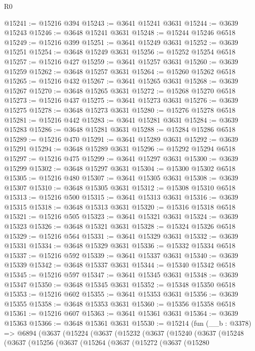 \begin{lexlean}{R0}
\begin{coremodule}
@15241 := @15216 @394
@15243 := @3641 @15241 @3631
@15244 := @3639 @15243
@15246 := @3648 @15241 @3631
@15248 := @15244 @15246 @6518
@15249 := @15216 @399
@15251 := @3641 @15249 @3631
@15252 := @3639 @15251
@15254 := @3648 @15249 @3631
@15256 := @15252 @15254 @6518
@15257 := @15216 @427
@15259 := @3641 @15257 @3631
@15260 := @3639 @15259
@15262 := @3648 @15257 @3631
@15264 := @15260 @15262 @6518
@15265 := @15216 @432
@15267 := @3641 @15265 @3631
@15268 := @3639 @15267
@15270 := @3648 @15265 @3631
@15272 := @15268 @15270 @6518
@15273 := @15216 @437
@15275 := @3641 @15273 @3631
@15276 := @3639 @15275
@15278 := @3648 @15273 @3631
@15280 := @15276 @15278 @6518
@15281 := @15216 @442
@15283 := @3641 @15281 @3631
@15284 := @3639 @15283
@15286 := @3648 @15281 @3631
@15288 := @15284 @15286 @6518
@15289 := @15216 @470
@15291 := @3641 @15289 @3631
@15292 := @3639 @15291
@15294 := @3648 @15289 @3631
@15296 := @15292 @15294 @6518
@15297 := @15216 @475
@15299 := @3641 @15297 @3631
@15300 := @3639 @15299
@15302 := @3648 @15297 @3631
@15304 := @15300 @15302 @6518
@15305 := @15216 @480
@15307 := @3641 @15305 @3631
@15308 := @3639 @15307
@15310 := @3648 @15305 @3631
@15312 := @15308 @15310 @6518
@15313 := @15216 @500
@15315 := @3641 @15313 @3631
@15316 := @3639 @15315
@15318 := @3648 @15313 @3631
@15320 := @15316 @15318 @6518
@15321 := @15216 @505
@15323 := @3641 @15321 @3631
@15324 := @3639 @15323
@15326 := @3648 @15321 @3631
@15328 := @15324 @15326 @6518
@15329 := @15216 @564
@15331 := @3641 @15329 @3631
@15332 := @3639 @15331
@15334 := @3648 @15329 @3631
@15336 := @15332 @15334 @6518
@15337 := @15216 @592
@15339 := @3641 @15337 @3631
@15340 := @3639 @15339
@15342 := @3648 @15337 @3631
@15344 := @15340 @15342 @6518
@15345 := @15216 @597
@15347 := @3641 @15345 @3631
@15348 := @3639 @15347
@15350 := @3648 @15345 @3631
@15352 := @15348 @15350 @6518
@15353 := @15216 @602
@15355 := @3641 @15353 @3631
@15356 := @3639 @15355
@15358 := @3648 @15353 @3631
@15360 := @15356 @15358 @6518
@15361 := @15216 @607
@15363 := @3641 @15361 @3631
@15364 := @3639 @15363
@15366 := @3648 @15361 @3631
@15530 := @15214
    (fun (__b : @3378) =>
    @6894
      (@3637
        (@15224
          (@3637
            (@15232
              (@3637
                (@15240
                  (@3637
                    (@15248
                      (@3637
                        (@15256
                          (@3637
                            (@15264
                              (@3637
                                (@15272
                                  (@3637
                                    (@15280

\end{coremodule}
\end{lexlean}
